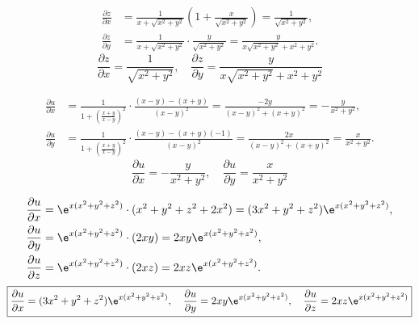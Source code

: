 \begin{solution}

    \begin{equation}
        \begin{aligned}
            \frac{\partial z}{\partial x} & = \frac{1}{x + \sqrt{x^2 + y^2}} \left( 1 + \frac{x}{\sqrt{x^2 + y^2}} \right) = \frac{1}{\sqrt{x^2 + y^2}}, \\
            \frac{\partial z}{\partial y} & = \frac{1}{x + \sqrt{x^2 + y^2}} \cdot \frac{y}{\sqrt{x^2 + y^2}} = \frac{y}{x\sqrt{x^2 + y^2} + x^2 + y^2}.
        \end{aligned}
    \end{equation}
    \begin{equation}
        \boxed{\frac{\partial z}{\partial x} = \frac{1}{\sqrt{x^2 + y^2}}, \quad \frac{\partial z}{\partial y} = \frac{y}{x\sqrt{x^2 + y^2} + x^2 + y^2}}
    \end{equation}


    \begin{equation}
        \begin{aligned}
            \frac{\partial u}{\partial x} & = \frac{1}{1 + \left( \frac{x+y}{x-y} \right)^2} \cdot \frac{(x-y) - (x+y)}{(x-y)^2} = \frac{-2y}{(x-y)^2 + (x+y)^2} = -\frac{y}{x^2 + y^2},   \\
            \frac{\partial u}{\partial y} & = \frac{1}{1 + \left( \frac{x+y}{x-y} \right)^2} \cdot \frac{(x-y) - (x+y)(-1)}{(x-y)^2} = \frac{2x}{(x-y)^2 + (x+y)^2} = \frac{x}{x^2 + y^2}.
        \end{aligned}
    \end{equation}
    \begin{equation}
        \boxed{\frac{\partial u}{\partial x} = -\frac{y}{x^2 + y^2}, \quad \frac{\partial u}{\partial y} = \frac{x}{x^2 + y^2}}
    \end{equation}


    \begin{equation}
        \begin{aligned}
            \frac{\partial u}{\partial x} & = \e^{x(x^2 + y^2 + z^2)} \cdot (x^2 + y^2 + z^2 + 2x^2) = (3x^2 + y^2 + z^2) \e^{x(x^2 + y^2 + z^2)}, \\
            \frac{\partial u}{\partial y} & = \e^{x(x^2 + y^2 + z^2)} \cdot (2xy) = 2xy \e^{x(x^2 + y^2 + z^2)},                                   \\
            \frac{\partial u}{\partial z} & = \e^{x(x^2 + y^2 + z^2)} \cdot (2xz) = 2xz \e^{x(x^2 + y^2 + z^2)}.
        \end{aligned}
    \end{equation}
    \begin{equation}
        \boxed{\frac{\partial u}{\partial x} = (3x^2 + y^2 + z^2) \e^{x(x^2 + y^2 + z^2)}, \quad \frac{\partial u}{\partial y} = 2xy \e^{x(x^2 + y^2 + z^2)}, \quad \frac{\partial u}{\partial z} = 2xz \e^{x(x^2 + y^2 + z^2)}}
    \end{equation}


\end{solution}
